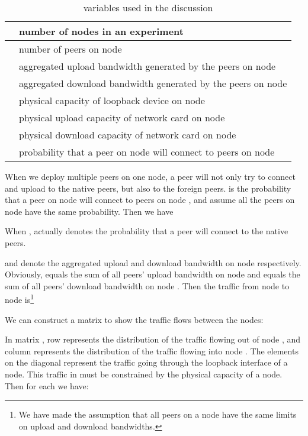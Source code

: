 \documentclass[10pt,letterpaper,twocolumn]{article}
\begin{document}
\begin{table}[!tb]
\renewcommand{\arraystretch}{1.0}
\centering
\begin{tabular}{|l|p{5.5cm}|}
\hline
 &  number of nodes in an experiment\\
\hline
 & number of peers on node \\
\hline
 &  aggregated upload bandwidth generated by the peers on node \\
\hline
 &  aggregated download bandwidth generated by the peers on node \\
\hline
 & physical capacity of loopback device on node \\
\hline
 & physical upload capacity of network card on node \\
\hline
 & physical download capacity of network card on node \\
\hline
 &  probability that a peer on node  will connect to peers on node  \\
\hline
\end{tabular}
\caption{variables used in the discussion}
\label{tab:table_cpvar}
\end{table}

When we deploy multiple peers on one node, a peer will not only try to
connect and upload to the native peers, but also to the foreign
peers.  is the probability that a peer on node  will
connect to peers on node , and assume all the peers on node 
have the same probability. Then we have



When ,  actually denotes the probability that a peer will
connect to the native peers. 






 and  denote the aggregated upload and download bandwidth on
node  respectively. Obviously,  equals the sum of all peers'
upload bandwidth on node  and  equals the sum of all peers'
download bandwidth on node . Then the traffic from node  to node
 is\footnote{We have made the assumption that all peers on a node
  have the same limits on upload and download bandwidths.}



We can construct a matrix to show the traffic flows between the nodes:


In matrix , row  represents the distribution of the traffic
flowing out of node , and column  represents the distribution of
the traffic flowing into node . The elements on the diagonal
represent the traffic going through the loopback interface of a
node. This traffic in  must be constrained by the physical capacity
of a node. Then for each  we have:
\end{document}
